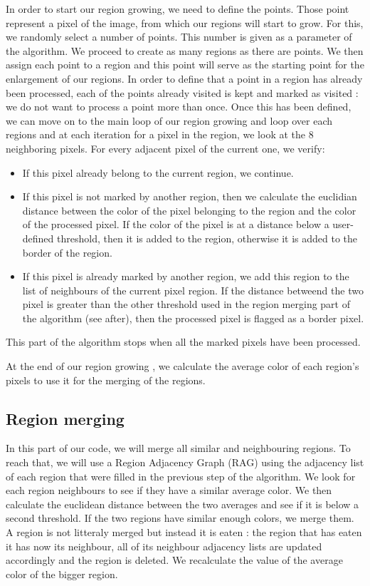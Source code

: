 \documentclass[conference]{IEEEtran}
\begin{document}
In order to start our region growing, we need to define the points. Those point represent a pixel of the image, from which our regions will start to grow. For this, we randomly select a number of points. This number is given as a parameter of the algorithm. We proceed to create as many regions as there are points. We then assign each point to a region and this point will serve as the starting point for the enlargement of our regions. In order to define that a point in a region has already been processed, each of the points already visited is kept and marked as visited : we do not want to process a point more than once.
Once this has been defined, we can move on to the main loop of our region growing and loop over each regions and at each iteration for a pixel in the region, we look at the 8 neighboring pixels. For every adjacent pixel of the current one, we verify: 
\begin{itemize}
\item If this pixel already belong to the current region, we continue. 
\item If this pixel is not marked by another region, then we calculate the euclidian distance between the color of the pixel belonging to the region and the color of the processed pixel. If the color of the pixel is at a distance below a user-defined threshold, then it is added to the region, otherwise it is added to the border of the region.
\item If this pixel is already marked by another region, we add this region to the list of neighbours of the current pixel region. If the distance betweend the two pixel is greater than the other threshold used in the region merging part of the algorithm (see after), then the processed pixel is flagged as a border pixel.
\end{itemize}

This part of the algorithm stops when all the marked pixels have been processed. 

At the end of our region growing , we calculate the average color of each region's pixels to use it for the merging of the regions.


\subsection{Region merging}

In this part of our code, we will merge all similar and neighbouring regions. To reach that, we will use a Region Adjacency Graph (RAG) using the adjacency list of each region that were filled in the previous step of the algorithm. We look for each region neighbours to see if they have a similar average color. We then calculate the euclidean distance between the two averages and see if it is below a second threshold. If the two regions have similar enough colors, we merge them. A region is not litteraly merged but instead it is eaten :
the region that has eaten it has now its neighbour, all of its neighbour adjacency lists are updated accordingly and the region is deleted. We recalculate the value of the average color of the bigger region.
\end{document}
